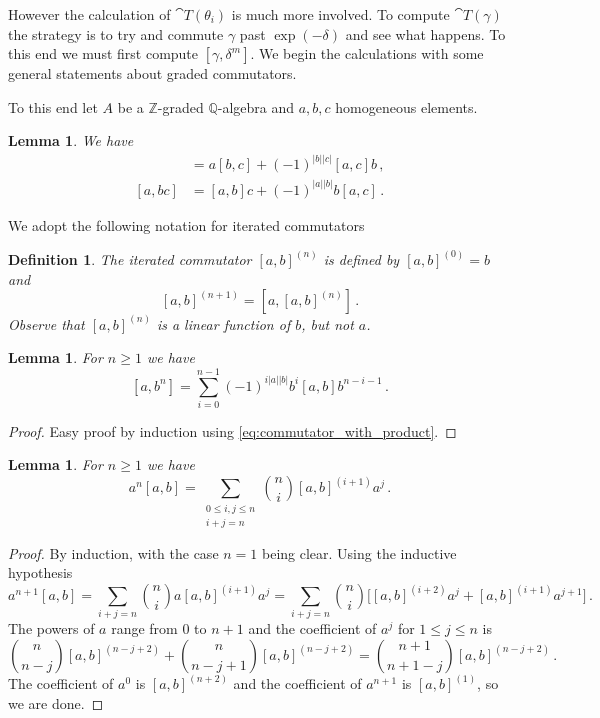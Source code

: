 \documentclass[english,letter paper,12pt,leqno]{article}
\newtheorem{lemma}[theorem]{Lemma}
\theoremstyle{example}
\newtheorem{definition}[theorem]{Definition}
\numberwithin{equation}{section}
\def\be{\begin{equation}}
\def\ee{\end{equation}}
\def\nZ{\mathds{Z}}
\def\nQ{\mathds{Q}}
\begin{document}
However the calculation of $\cat{T}(\theta_i)$ is much more involved. To compute $\cat{T}(\gamma)$ the strategy is to try and commute $\gamma$ past $\exp(-\delta)$ and see what happens. To this end we must first compute $[\gamma, \delta^m]$. We begin the calculations with some general statements about graded commutators. 

To this end let $A$ be a $\nZ$-graded $\nQ$-algebra and $a,b,c$ homogeneous elements.

\begin{lemma} We have
\begin{align}
[ab,c] &= a[b,c] + (-1)^{|b||c|} [a,c]b\,,\\
[a,bc] &= [a,b]c + (-1)^{|a||b|} b[a,c]\,. \label{eq:commutator_with_product}
\end{align}
\end{lemma}

We adopt the following notation for iterated commutators

\begin{definition} The iterated commutator $[a,b]^{(n)}$ is defined by $[a,b]^{(0)} = b$ and
\[
[a,b]^{(n+1)} = [a, [a,b]^{(n)}]\,.
\]
Observe that $[a,b]^{(n)}$ is a linear function of $b$, but not $a$.
\end{definition}

\begin{lemma}\label{lemma:woop3} For $n \ge 1$ we have
\[
[a,b^n] = \sum_{i=0}^{n-1} (-1)^{i|a||b|} b^i [a,b] b^{n-i-1}\,.
\]
\end{lemma}
\begin{proof}
Easy proof by induction using \eqref{eq:commutator_with_product}.
\end{proof}

\begin{lemma}\label{lemma:woop4} For $n \ge 1$ we have
\be
a^n [a, b] = \sum_{\substack{0 \le i,j \le n \\ i+j=n}} \binom{n}{i} [a,b]^{(i+1)} a^j\,.
\ee
\end{lemma}
\begin{proof}
By induction, with the case $n = 1$ being clear. Using the inductive hypothesis
\[
a^{n+1} [a, b] = \sum_{i+j=n} \binom{n}{i} a [a,b]^{(i+1)} a^j = \sum_{i+j=n} \binom{n}{i} \Big[ [a,b]^{(i+2)} a^j + [a,b]^{(i+1)} a^{j+1} \Big]\,.
\]
The powers of $a$ range from $0$ to $n+1$ and the coefficient of $a^j$ for $1 \le j \le n$ is
\[
\binom{n}{n-j} [a,b]^{(n-j+2)} + \binom{n}{n-j+1} [a,b]^{(n-j+2)} = \binom{n+1}{n+1-j} [a,b]^{(n-j+2)}\,.
\]
The coefficient of $a^0$ is $[a,b]^{(n+2)}$ and the coefficient of $a^{n+1}$ is $[a,b]^{(1)}$, so we are done.
\end{proof}
\end{document}

